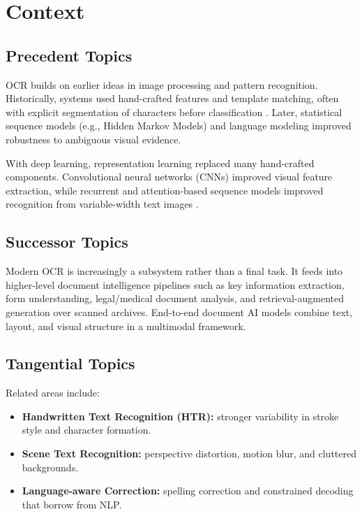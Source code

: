 \documentclass[11pt]{article}
\begin{document}
\section{Context}
\subsection{Precedent Topics}
OCR builds on earlier ideas in image processing and pattern recognition. Historically, systems used hand-crafted features and template matching, often with explicit segmentation of characters before classification \cite{mori1999ocrsurvey}. Later, statistical sequence models (e.g., Hidden Markov Models) and language modeling improved robustness to ambiguous visual evidence.

With deep learning, representation learning replaced many hand-crafted components. Convolutional neural networks (CNNs) improved visual feature extraction, while recurrent and attention-based sequence models improved recognition from variable-width text images \cite{shi2016crnn,jaderberg2016reading}.

\subsection{Successor Topics}
Modern OCR is increasingly a subsystem rather than a final task. It feeds into higher-level document intelligence pipelines such as key information extraction, form understanding, legal/medical document analysis, and retrieval-augmented generation over scanned archives. End-to-end document AI models combine text, layout, and visual structure in a multimodal framework.

\subsection{Tangential Topics}
Related areas include:
\begin{itemize}[leftmargin=*]
    \item \textbf{Handwritten Text Recognition (HTR):} stronger variability in stroke style and character formation.
    \item \textbf{Scene Text Recognition:} perspective distortion, motion blur, and cluttered backgrounds.
    \item \textbf{Language-aware Correction:} spelling correction and constrained decoding that borrow from NLP.
\end{itemize}
\end{document}
